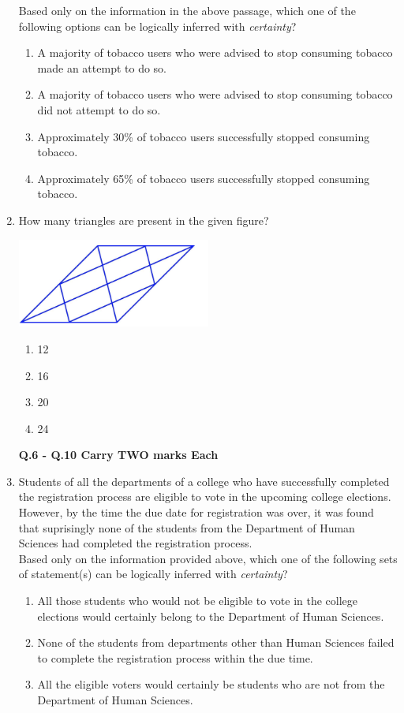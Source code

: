 \documentclass[journal,13pt,onecolumn]{exam}
\theoremstyle{remark}
\begin{document}
\begin{enumerate}[label=Q.\arabic*]
\medskip

Based only on the information in the above passage, which one of the following options can be logically inferred with \textit{certainty}?

\begin{enumerate}[label=(\Alph*)]
    \item A majority of tobacco users who were advised to stop consuming tobacco made an attempt to do so.
    \item A majority of tobacco users who were advised to stop consuming tobacco did not attempt to do so.
    \item Approximately 30\% of tobacco users successfully stopped consuming tobacco.
    \item Approximately 65\% of tobacco users successfully stopped consuming tobacco.
\end{enumerate}

\item How many triangles are present in the given figure?
\begin{center}
    \includegraphics[width=0.5\textwidth]{figs/a2q5.png}
\end{center}

\begin{enumerate}
    \item 12
    \item 16
    \item 20
    \item 24
\end{enumerate}
\newpage
\textbf{Q.6 - Q.10 Carry TWO marks Each}
\item Students of all the departments of a college who have successfully completed the registration process are eligible to vote in the upcoming college elections. However, by the time the due date for registration was over, it was found that suprisingly none of the students from the Department of Human Sciences had completed the registration process.\\

Based only on the information provided above, which one of the following sets of statement(s) can be logically inferred with \textit{certainty}?
\begin{enumerate}[label=(\roman*)]
     \item All those students who would not be eligible to vote in the college elections would certainly belong to the Department of Human Sciences. 
    \item None of the students from departments other than Human Sciences failed to complete the registration process within the due time.
    \item All the eligible voters would certainly be students who are not from the Department of Human Sciences. 
\end{enumerate}


\end{enumerate}
\end{document}
